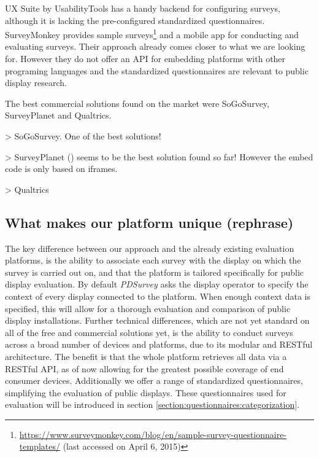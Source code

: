 	UX Suite by UsabilityTools has a handy backend for configuring surveys, although it is lacking the pre-configured standardized questionnaires. 
	SurveyMonkey provides sample surveys\footnote{\url{https://www.surveymonkey.com/blog/en/sample-survey-questionnaire-templates/} (last accessed on April 6, 2015)} and a mobile app for conducting and evaluating surveys. Their approach already comes closer to what we are looking for. However they do not offer an API for embedding platforms with other programing languages and the standardized questionnaires are relevant to public display research.

	The best commercial solutions found on the market were SoGoSurvey, SurveyPlanet and Qualtrics. 

		> SoGoSurvey. One of the best solutions!

		> SurveyPlanet () seems to be the best solution found so far! However the embed code is only based on iframes.

		> Qualtrics








	\subsection{What makes our platform unique (rephrase)}
	The key difference between our approach and the already existing evaluation platforms, is the ability to associate each survey with the display on which the survey is carried out on, and that the platform is tailored specifically for public display evaluation.
	By default \textit{PDSurvey} asks the display operator to specify the context of every display connected to the platform. When enough context data is specified, this will allow for a thorough evaluation and comparison of public display installations.
	Further technical differences, which are not yet standard on all of the free and commercial solutions yet, is the ability to conduct surveys across a broad number of devices and platforms, due to its modular and RESTful architecture. The benefit is that the whole platform retrieves all data via a RESTful API, as of now allowing for the greatest possible coverage of end consumer devices. Additionally we offer a range of standardized questionnaires, simplifying the evaluation of public displays. These questionnaires used for evaluation will be introduced in section \ref{section:questionnaires:categorization}.

